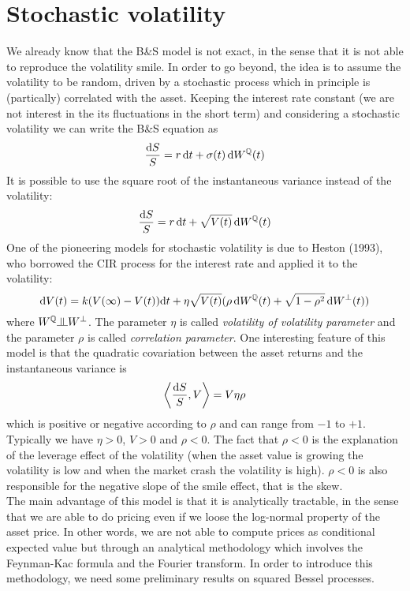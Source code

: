 \section{Stochastic volatility}
We already know that the B\&S model is not exact, in the sense that it is not able to reproduce the volatility smile. In order to go beyond, the idea is to assume the volatility to be random, driven by a stochastic process which in principle is (partically) correlated with the asset. Keeping the interest rate constant (we are not interest in the its fluctuations in the short term) and considering a stochastic volatility we can write the B\&S equation as
\begin{equation}
    \frac{\dd S}{S} = r\,\dd t + \sigma(t)\,\dd W^{\mathbb{Q}}(t)
\end{equation}
It is possible to use the square root of the instantaneous variance instead of the volatility:
\begin{equation}
    \frac{\dd S}{S} = r\,\dd t + \sqrt{V(t)}\,\dd W^{\mathbb{Q}}(t)
\end{equation}
One of the pioneering models for stochastic volatility is due to Heston (1993), who borrowed the CIR process for the interest rate and applied it to the volatility:
\begin{equation}
    \dd V(t) = k(V(\infty)-V(t))\dd t + \eta\sqrt{V(t)}(\rho\,\dd W^{\mathbb{Q}}(t) + \sqrt{1-\rho^2}\,\dd W^{\perp}(t))
\end{equation}%
where $W^{\Qmeas}\indep W^{\perp}$. The parameter $\eta$ is called \emph{volatility of volatility parameter} and the parameter $\rho$ is called \emph{correlation parameter}. One interesting feature of this model is that the quadratic covariation between the asset returns and the instantaneous variance is
\begin{equation*}
    \expval{\frac{\dd S}{S}, V} = V\eta\rho
\end{equation*}
which is positive or negative according to $\rho$ and can range from $-1$ to $+1$. Typically we have $\eta>0$, $V>0$ and $\rho<0$. The fact that $\rho<0$ is the explanation of the leverage effect of the volatility (when the asset value is growing the volatility is low and when the market crash the volatility is high). $\rho<0$ is also responsible for the negative slope of the smile effect, that is the skew. \\ %
The main advantage of this model is that it is analytically tractable, in the sense that we are able to do pricing even if we loose the log-normal property of the asset price. In other words, we are not able to compute prices as conditional expected value but through an analytical methodology which involves the Feynman-Kac formula and the Fourier transform. In order to introduce this methodology, we need some preliminary results on squared Bessel processes.

